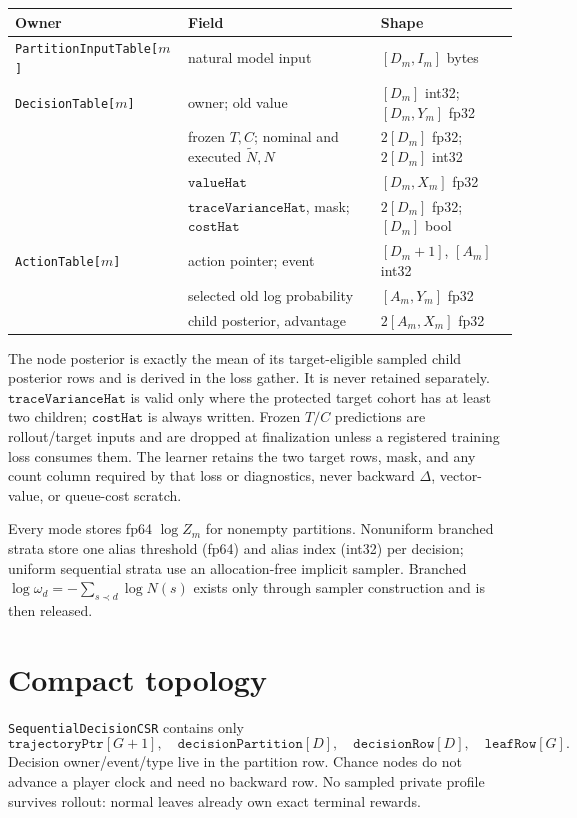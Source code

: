 \documentclass[10pt,a4paper]{article}
\newcommand{\Obj}[1]{\texttt{#1}}
\begin{document}
\begin{center}
\begin{tabular}{p{}p{}p{}}
\toprule
Owner & Field & Shape \\
\midrule
\Obj{PartitionInputTable[$m$]} & natural model input & $[D_m,I_m]$ bytes \\
\Obj{DecisionTable[$m$]} & owner; old value & $[D_m]$ int32; $[D_m,Y_m]$ fp32 \\
& frozen $T,C$; nominal and executed $\widetilde N,N$ & $2[D_m]$ fp32; $2[D_m]$ int32 \\
& $\mathtt{valueHat}$ & $[D_m,X_m]$ fp32 \\
& $\mathtt{traceVarianceHat}$, mask; $\mathtt{costHat}$ & $2[D_m]$ fp32; $[D_m]$ bool \\
\Obj{ActionTable[$m$]} & action pointer; event & $[D_m+1]$, $[A_m]$ int32 \\
& selected old log probability & $[A_m,Y_m]$ fp32 \\
& child posterior, advantage & $2[A_m,X_m]$ fp32 \\
\bottomrule
\end{tabular}
\end{center}
The node posterior is exactly the mean of its target-eligible sampled child
posterior rows and is derived in the loss gather.  It is never retained
separately.  $\mathtt{traceVarianceHat}$ is valid only where the protected
target cohort has at least two children; $\mathtt{costHat}$ is always written.
Frozen $T/C$ predictions are rollout/target inputs and are dropped at
finalization unless a registered training loss consumes them.  The learner
retains the two target rows, mask, and any count column required by that loss or
diagnostics, never backward $\Delta$, vector-value, or queue-cost scratch.

Every mode stores fp64 $\log Z_m$ for nonempty partitions.  Nonuniform branched
strata store one alias threshold (fp64) and alias index (int32) per decision;
uniform sequential strata use an allocation-free implicit sampler.  Branched
$\log\omega_d=-\sum_{s\prec d}\log N(s)$ exists only through sampler
construction and is then released.

\section{Compact topology}

\Obj{SequentialDecisionCSR} contains only
\[
 \mathtt{trajectoryPtr}[G+1],\quad
 \mathtt{decisionPartition}[D],\quad
 \mathtt{decisionRow}[D],\quad
 \mathtt{leafRow}[G].
\]
Decision owner/event/type live in the partition row.  Chance nodes do not
advance a player clock and need no backward row.  No sampled private profile
survives rollout: normal leaves already own exact terminal rewards.
\end{document}
